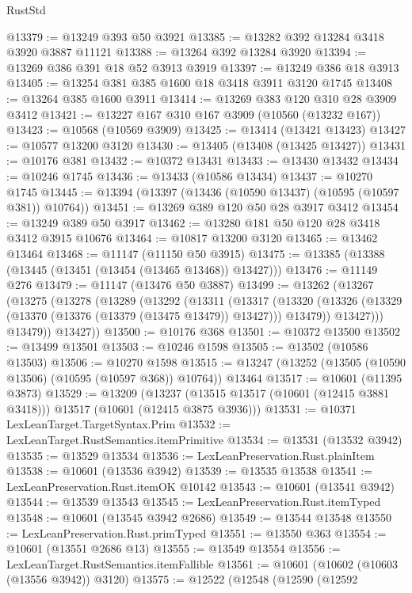 \begin{lexlean}{RustStd}
\begin{coremodule}
@13379 := @13249 @393 @50 @3921
@13385 := @13282 @392 @13284 @3418 @3920 @3887 @11121
@13388 := @13264 @392 @13284 @3920
@13394 := @13269 @386 @391 @18 @52 @3913 @3919
@13397 := @13249 @386 @18 @3913
@13405 := @13254 @381 @385 @1600 @18 @3418 @3911 @3120 @1745
@13408 := @13264 @385 @1600 @3911
@13414 := @13269 @383 @120 @310 @28 @3909 @3412
@13421 := @13227 @167 @310 @167 @3909 (@10560 (@13232 @167))
@13423 := @10568 (@10569 @3909)
@13425 := @13414 (@13421 @13423)
@13427 := @10577 @13200 @3120
@13430 := @13405 (@13408 (@13425 @13427))
@13431 := @10176 @381
@13432 := @10372 @13431
@13433 := @13430 @13432
@13434 := @10246 @1745
@13436 := @13433 (@10586 @13434)
@13437 := @10270 @1745
@13445 := @13394 (@13397 (@13436 (@10590 @13437) (@10595 (@10597 @381)) @10764))
@13451 := @13269 @389 @120 @50 @28 @3917 @3412
@13454 := @13249 @389 @50 @3917
@13462 := @13280 @181 @50 @120 @28 @3418 @3412 @3915 @10676
@13464 := @10817 @13200 @3120
@13465 := @13462 @13464
@13468 := @11147 (@11150 @50 @3915)
@13475 := @13385 (@13388 (@13445 (@13451 (@13454 (@13465 @13468)) @13427)))
@13476 := @11149 @276
@13479 := @11147 (@13476 @50 @3887)
@13499 := @13262
    (@13267
      (@13275
        (@13278
          (@13289
            (@13292
              (@13311
                (@13317
                  (@13320
                    (@13326 (@13329 (@13370 (@13376 (@13379 (@13475 @13479)) @13427))) @13479))
                  @13427)))
            @13479))
        @13427))
@13500 := @10176 @368
@13501 := @10372 @13500
@13502 := @13499 @13501
@13503 := @10246 @1598
@13505 := @13502 (@10586 @13503)
@13506 := @10270 @1598
@13515 := @13247 (@13252 (@13505 (@10590 @13506) (@10595 (@10597 @368)) @10764)) @13464
@13517 := @10601 (@11395 @3873)
@13529 := @13209
    (@13237 (@13515 @13517 (@10601 (@12415 @3881 @3418))) @13517 (@10601 (@12415 @3875 @3936)))
@13531 := @10371 LexLeanTarget.TargetSyntax.Prim
@13532 := LexLeanTarget.RustSemantics.itemPrimitive
@13534 := @13531 (@13532 @3942)
@13535 := @13529 @13534
@13536 := LexLeanPreservation.Rust.plainItem
@13538 := @10601 (@13536 @3942)
@13539 := @13535 @13538
@13541 := LexLeanPreservation.Rust.itemOK @10142
@13543 := @10601 (@13541 @3942)
@13544 := @13539 @13543
@13545 := LexLeanPreservation.Rust.itemTyped
@13548 := @10601 (@13545 @3942 @2686)
@13549 := @13544 @13548
@13550 := LexLeanPreservation.Rust.primTyped
@13551 := @13550 @363
@13554 := @10601 (@13551 @2686 @13)
@13555 := @13549 @13554
@13556 := LexLeanTarget.RustSemantics.itemFallible
@13561 := @10601 (@10602 (@10603 (@13556 @3942)) @3120)
@13575 := @12522
    (@12548
      (@12590
        (@12592

\end{coremodule}
\end{lexlean}

